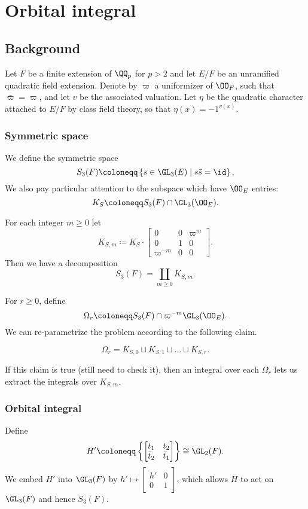 \chapter{Orbital integral}
\section{Background}
Let $F$ be a finite extension of $\QQ_p$ for $p > 2$ and
let $E/F$ be an unramified quadratic field extension.
Denote by $\varpi$ a uniformizer of $\OO_F$, such that $\bar \varpi = \varpi$,
and let $v$ be the associated valuation.
Let $\eta$ be the quadratic character attached to $E/F$ by class field theory,
so that $\eta(x) = -1^{v(x)}$.

\subsection{Symmetric space}
We define the symmetric space
\[ S_3(F) \coloneqq \left\{ s \in \GL_3(E) \mid s \bar s = \id \right\}. \]
We also pay particular attention to the subspace which have $\OO_E$ entries:
\[ K_S \coloneqq S_3(F) \cap \GL_3(\OO_E). \]
\begin{lemma}
  For each integer $m \ge 0$ let
  \[ K_{S,m} \coloneqq K_S \cdot \begin{bmatrix} 0 & 0 & \varpi^m \\ 0 & 1 & 0 \\ \varpi^{-m} & 0 & 0 \end{bmatrix}. \]
  Then we have a decomposition
  \[ S_3(F) = \coprod_{m \geq 0} K_{S,m}. \]
\end{lemma}
For $r \geq 0$, define
\[ \Omega_r \coloneqq S_3(F) \cap \varpi^{-m} \GL_3(\OO_E). \]
We can re-parametrize the problem according to the following claim.
\begin{claim}
  \[ \Omega_r = K_{S,0} \sqcup K_{S,1} \sqcup \dots \sqcup K_{S,r}. \]
\end{claim}
If this claim is true (still need to check it),
then an integral over each $\Omega_r$ lets us extract the integrals over $K_{S,m}$.

\subsection{Orbital integral}
Define
\[ H' \coloneqq
  \left\{ \begin{bmatrix} t_1 & t_2 \\ \bar t_2 & \bar t_1 \end{bmatrix} \right\}
  \cong \GL_2(F). \]
We embed $H'$ into $\GL_3(F)$ by
$h' \mapsto \left[ \begin{smallmatrix} h' & 0 \\ 0 & 1 \end{smallmatrix} \right]$,
which allows $H$ to act on $\GL_3(F)$ and hence $S_3(F)$.

